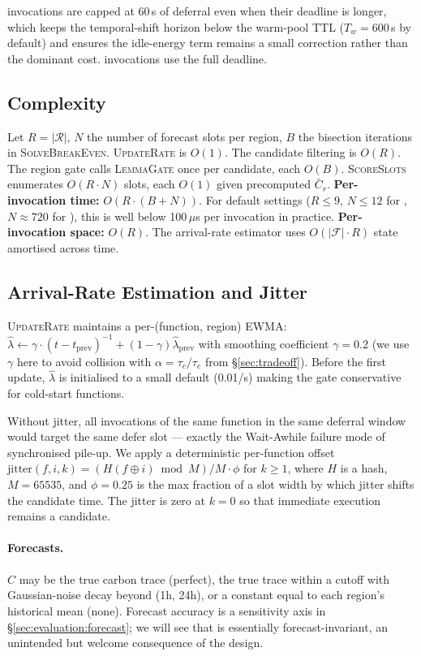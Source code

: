 \Deferrable{} invocations are capped at 60\,s of deferral even when
their deadline is longer, which keeps the temporal-shift horizon
below the warm-pool TTL ($T_w = 600$\,s by default) and ensures the
idle-energy term remains a small correction rather than the dominant
cost. \Background{} invocations use the full deadline.

\subsection{Complexity}
\label{sec:algorithm:complexity}

Let $R = |\mathcal{R}|$, $N$ the number of forecast slots per region,
$B$ the bisection iterations in \textsc{SolveBreakEven}.
\textsc{UpdateRate} is $O(1)$. The candidate filtering is $O(R)$.
The region gate calls \textsc{LemmaGate} once per candidate, each
$O(B)$. \textsc{ScoreSlots} enumerates $O(R \cdot N)$ slots, each
$O(1)$ given precomputed $\bar{C}_r$. \textbf{Per-invocation time:}
$O(R \cdot (B + N))$. For default settings ($R \le 9$,
$N \le 12$ for \Deferrable, $N \approx 720$ for \Background), this
is well below 100\,$\mu$s per invocation in practice. \textbf{Per-invocation
space:} $O(R)$. The arrival-rate estimator uses
$O(|\mathcal{F}| \cdot R)$ state amortised across time.

\subsection{Arrival-Rate Estimation and Jitter}
\label{sec:algorithm:estimation}

\textsc{UpdateRate} maintains a per-(function, region) EWMA:
$\hat\lambda \leftarrow \gamma \cdot (t - t_{\mathrm{prev}})^{-1}
+ (1 - \gamma) \hat\lambda_{\mathrm{prev}}$ with smoothing
coefficient $\gamma = 0.2$ (we use $\gamma$ here to avoid collision
with $\alpha = \tau_c/\tau_e$ from \S\ref{sec:tradeoff}). Before
the first update, $\hat\lambda$ is initialised to a small
default (0.01/s) making the gate conservative for cold-start
functions.

Without jitter, all invocations of the same function in the same
deferral window would target the same defer slot --- exactly the
Wait-Awhile failure mode of synchronised pile-up. We apply a
deterministic per-function offset
$\mathrm{jitter}(f, i, k) = (H(f \oplus i) \bmod M) / M \cdot \phi$
for $k \ge 1$, where $H$ is a hash, $M = 65535$, and $\phi = 0.25$
is the max fraction of a slot width by which jitter shifts the
candidate time. The jitter is zero at $k=0$ so that immediate
execution remains a candidate.

\paragraph{Forecasts.} $\hat{C}$ may be the true carbon trace
(\textsf{perfect}), the true trace within a cutoff with Gaussian-noise
decay beyond (\textsf{1h}, \textsf{24h}), or a constant equal to each
region's historical mean (\textsf{none}). Forecast accuracy is a
sensitivity axis in \S\ref{sec:evaluation:forecast}; we will see that
\GreenFaaS{} is essentially forecast-invariant, an unintended but
welcome consequence of the design.
